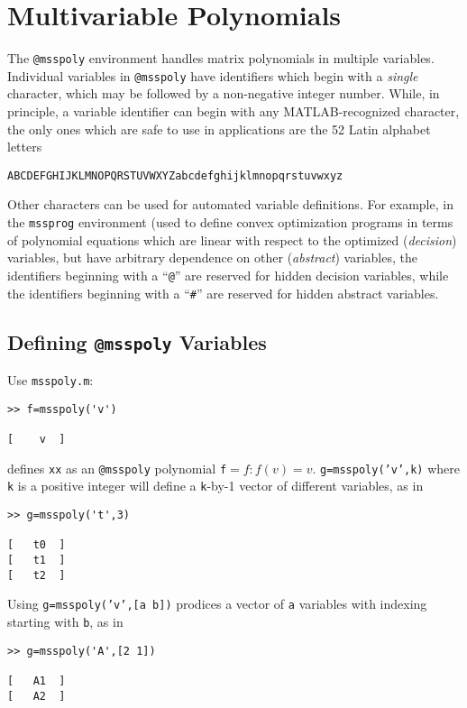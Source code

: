 \documentclass[12pt]{article}
\newcounter{example}
\begin{document}
\section{Multivariable Polynomials}
The {\tt @msspoly} environment handles matrix polynomials in multiple variables.
Individual variables in {\tt @msspoly} have identifiers which begin with a 
{\sl single} character, which may be followed by a non-negative integer number.
While, in principle, a variable identifier can begin with
any MATLAB-recognized character, the only ones which are safe to use in applications
are the 52 Latin alphabet letters
\begin{verbatim}
ABCDEFGHIJKLMNOPQRSTUVWXYZabcdefghijklmnopqrstuvwxyz
\end{verbatim}
Other characters can be used for automated variable definitions. For example,
in the {\tt mssprog} environment (used to define convex optimization programs
in terms of polynomial equations which are linear with respect to the optimized
({\sl decision}) variables, but have arbitrary dependence on other ({\sl abstract})
variables,
the identifiers beginning with a ``{\tt @}'' are reserved for hidden decision
variables, while the identifiers  beginning with a ``{\tt \#}'' are reserved for 
hidden abstract variables.

\subsection{Defining {\tt @msspoly} Variables}
Use {\tt msspoly.m}:
\begin{verbatim}
>> f=msspoly('v')

[    v  ]
\end{verbatim}
defines {\tt xx} as an {\tt @msspoly} polynomial {\tt f}$=f: f(v)=v$.
{\tt g=msspoly('v',k)} where {\tt k} is a positive integer
will define a {\tt k}-by-1 vector of different variables, as in
\begin{verbatim}
>> g=msspoly('t',3)

[   t0  ]
[   t1  ]
[   t2  ]
\end{verbatim}
Using {\tt g=msspoly('v',[a b])} prodices a vector of {\tt a} variables with indexing
starting with {\tt b}, as in
\begin{verbatim}
>> g=msspoly('A',[2 1])

[   A1  ]
[   A2  ]
\end{verbatim}
\end{document}
